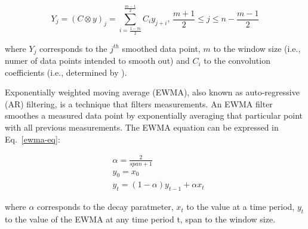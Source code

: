 \begin{equation}\label{sg-eq}
    Y_j=(C\otimes y)_j=\sum_{i=\frac{1-m}{2}}^{\frac{m-1}{2}}C_iy_{j+i},\,\frac{m+1}{2}\le j\le n-\frac{m-1}{2}
\end{equation}

\noindent
where $Y_j$ corresponds to the $j^{th}$ smoothed data point, $m$ to the window size (i.e., numer of data points intended to smooth out) and $C_i$ to the convolution coefficients (i.e., determined by \citet{savitzkySmoothingDifferentiationData1964}). 

Exponentially weighted moving average (EWMA), also known as auto-regressive (AR) filtering, is a technique that filters measurements. An EWMA filter smoothes a measured data point by exponentially averaging that particular point with all previous measurements. The EWMA equation can be expressed in Eq.~\ref{ewma-eq}:

\begin{equation}\label{ewma-eq}
    \begin{aligned}
        &\alpha=\frac{2}{span+1} \\
        &y_0=x_0 \\
        &y_t=(1-\alpha)y_{t-1}+\alpha x_t
    \end{aligned}
\end{equation}

\noindent
where $\alpha$ corresponds to the decay paratmeter, $x_t$ to the value at a time period, $y_t$ to the value of the EWMA at any time period t, span to the window size.

